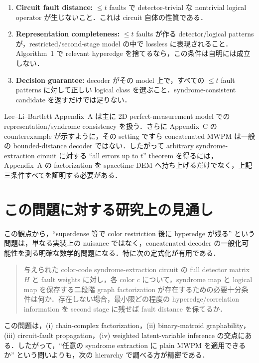 \documentclass[a4paper,11pt]{ltjsarticle}
\begin{document}
\begin{enumerate}
  \item \textbf{Circuit fault distance:} $\le t$ faults で detector-trivial な nontrivial logical operator が生じないこと．これは circuit 自体の性質である．
  \item \textbf{Representation completeness:} $\le t$ faults が作る detector/logical patterns が，restricted/second-stage model の中で lossless に表現されること．Algorithm~1 で relevant hyperedge を捨てるなら，この条件は自明には成立しない．
  \item \textbf{Decision guarantee:} decoder がその model 上で，すべての $\le t$ fault patterns に対して正しい logical class を選ぶこと．syndrome-consistent candidate を返すだけでは足りない．
\end{enumerate}

Lee--Li--Bartlett Appendix~A は主に 2D perfect-measurement model での representation/syndrome consistency を扱う．さらに Appendix~C の counterexample が示すように，その setting ですら concatenated MWPM は一般の bounded-distance decoder ではない．したがって arbitrary syndrome-extraction circuit に対する ``all errors up to $t$'' theorem を得るには，Appendix~A の factorization を spacetime DEM へ持ち上げるだけでなく，上記三条件すべてを証明する必要がある．

\section{この問題に対する研究上の見通し}

この観点から，``superdense 等で color restriction 後に hyperedge が残る'' という問題は，単なる実装上の nuisance ではなく，concatenated decoder の一般化可能性を測る明確な数学的問題になる．特に次の定式化が有用である．

\begin{quote}
与えられた color-code syndrome-extraction circuit の full detector matrix $H$ と fault weights に対し，各 color $c$ について，syndrome map と logical map を保存する二段階 graph factorization が存在するための必要十分条件は何か．存在しない場合，最小限どの程度の hyperedge/correlation information を second stage に残せば fault distance を保てるか．
\end{quote}

この問題は，(i) chain-complex factorization，(ii) binary-matroid graphability，(iii) circuit-fault propagation，(iv) weighted latent-variable inference の交点にある．したがって，``任意の syndrome extraction に plain MWPM を適用できるか'' という問いよりも，次の hierarchy で調べる方が精密である．
\end{document}
